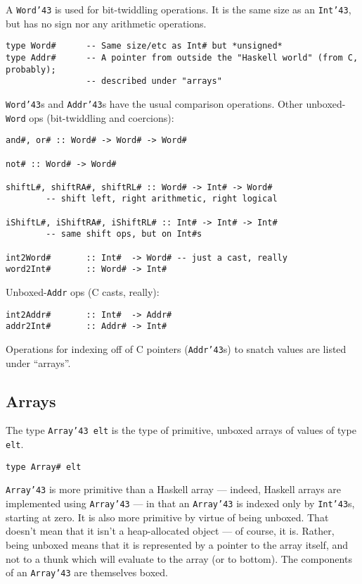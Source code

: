 A \mbox{\tt Word{\char'43}} is used for bit-twiddling operations.  It is the same size as
an \mbox{\tt Int{\char'43}}, but has no sign nor any arithmetic operations.
\begin{verbatim}
type Word#      -- Same size/etc as Int# but *unsigned*
type Addr#      -- A pointer from outside the "Haskell world" (from C, probably);
                -- described under "arrays"
\end{verbatim}
\mbox{\tt Word{\char'43}}s and \mbox{\tt Addr{\char'43}}s have the usual comparison operations.
Other unboxed-\mbox{\tt Word} ops (bit-twiddling and coercions):
\begin{verbatim}
and#, or# :: Word# -> Word# -> Word#

not# :: Word# -> Word#

shiftL#, shiftRA#, shiftRL# :: Word# -> Int# -> Word#
        -- shift left, right arithmetic, right logical

iShiftL#, iShiftRA#, iShiftRL# :: Int# -> Int# -> Int#
        -- same shift ops, but on Int#s

int2Word#       :: Int#  -> Word# -- just a cast, really
word2Int#       :: Word# -> Int#
\end{verbatim}

Unboxed-\mbox{\tt Addr} ops (C casts, really):
\begin{verbatim}
int2Addr#       :: Int#  -> Addr#
addr2Int#       :: Addr# -> Int#
\end{verbatim}
Operations for indexing off of C pointers (\mbox{\tt Addr{\char'43}}s) to snatch values
are listed under ``arrays''.

\subsection{Arrays}

The type \mbox{\tt Array{\char'43}\ elt} is the type of primitive,
unboxed arrays of values of type \mbox{\tt elt}.  
\begin{verbatim}
type Array# elt
\end{verbatim}
\mbox{\tt Array{\char'43}} is more primitive than a Haskell
array --- indeed, Haskell arrays are implemented using \mbox{\tt Array{\char'43}} ---
in that an \mbox{\tt Array{\char'43}} is indexed only by \mbox{\tt Int{\char'43}}s, starting at zero.  It is also
more primitive by virtue of being unboxed.  That doesn't mean that it isn't
a heap-allocated object --- of course, it is.  Rather, being unboxed means
that it is represented by a pointer to the array itself, and not to a thunk
which will evaluate to the array (or to bottom).
The components of an \mbox{\tt Array{\char'43}} are themselves boxed.

